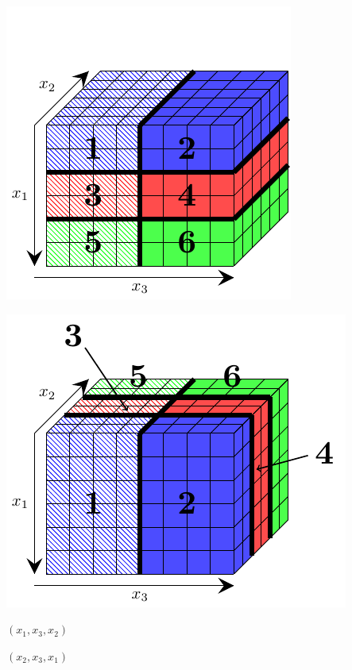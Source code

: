 \documentclass{beamer}
\newif\ifUsedMaxNProc      \newif\ifUsedDimsNotDistrib    \newif\ifUsedDimsContig
\begin{document}
 \UsedMaxNProctrue
 
 
\begin{frame} 
 \begin{minipage}[b]{.4\textwidth}
  \includegraphics[scale=0.6]{Probleme/End}
 \end{minipage}
 \hspace{.05\textwidth}
 \begin{minipage}[b]{.45\textwidth}
  \includegraphics[scale=0.6]{Probleme/End2}
 \end{minipage}
 
 \begin{minipage}{.45\textwidth}
 \centering
 \Large
  $(x_1,x_3,x_2)$
 \end{minipage}
 \hspace{.05\textwidth}
 \begin{minipage}{.45\textwidth}
 \centering
 \Large
  $(x_2,x_3,x_1)$
 \end{minipage}
\end{frame}
\end{document}

